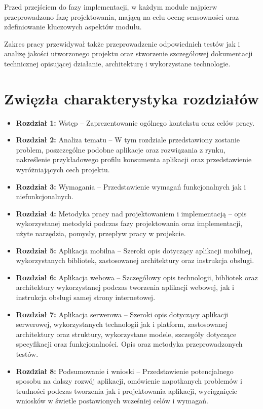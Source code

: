 \documentclass[a4paper,twoside,12pt]{book}
\begin{document}
Przed przejściem do fazy implementacji, w każdym module najpierw przeprowadzono fazę projektowania, mającą na celu ocenę sensowności oraz zdefiniowanie kluczowych aspektów modułu. 

Zakres pracy przewidywał także przeprowadzenie odpowiednich testów jak i analizę jakości utworzonego projektu oraz stworzenie szczegółowej dokumentacji technicznej opisującej działanie, architekturę i wykorzystane technologie.

\newpage

\section{Zwięzła charakterystyka rozdziałów}
\begin{itemize}
    \item \textbf{Rozdział 1:} Wstęp -- Zaprezentowanie ogólnego kontekstu oraz celów pracy.
    \item \textbf{Rozdział 2:} Analiza tematu -- W tym rozdziale przedstawiony zostanie problem, poszczególne podobne aplikacje oraz rozwiązania z rynku, nakreślenie przykładowego profilu konsumenta aplikacji oraz przedstawienie wyróżniających cech projektu.
    \item \textbf{Rozdział 3:} Wymagania -- Przedstawienie wymagań funkcjonalnych jak i niefunkcjonalnych.
    \item \textbf{Rozdział 4:} Metodyka pracy nad projektowaniem i implementacją -- opis wykorzystanej metodyki podczas fazy projektowania oraz implementacji, użyte narzędzia, pomysły, przepływ pracy w projekcie.
    \item \textbf{Rozdział 5:} Aplikacja mobilna -- Szeroki opis dotyczący aplikacji mobilnej, wykorzystanych bibliotek, zastosowanej architektury oraz instrukcja obsługi.
    \item \textbf{Rozdział 6:} Aplikacja webowa -- Szczegółowy opis technologii, bibliotek oraz architektury wykorzystanej podczas tworzenia aplikacji webowej, jak i instrukcja obsługi samej strony internetowej.
    \item \textbf{Rozdział 7:} Aplikacja serwerowa -- Szeroki opis dotyczący aplikacji serwerowej, wykorzystanych technologii jak i platform, zastosowanej architektury oraz struktury, wykorzystane modele, szczegóły dotyczące specyfikacji oraz funkcjonalności. Opis oraz metodyka przeprowadzonych testów.
    \item \textbf{Rozdział 8:} Podsumowanie i wnioski -- Przedstawienie potencjalnego sposobu na dalszy rozwój aplikacji, omówienie napotkanych problemów i trudności podczas tworzenia jak i projektowania aplikacji, wyciągnięcie wniosków w świetle postawionych wcześniej celów i wymagań.
\end{itemize}
\end{document}
